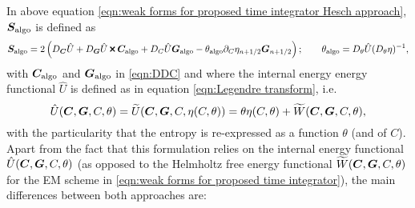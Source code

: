 In above equation \eqref{eqn:weak forms for proposed time integrator Hesch approach}, $\boldsymbol{S}_{\text{algo}}$ is defined as
%
\begin{equation}\label{eqn:approximated expression for DWdeltavarphi Betsch}
\begin{aligned}
\vect{S}_{\text{algo}} = 2\left(D_{\vect{C}}\hat{U} + D_{\vect{G}}\hat{U}\Cross\vect{C}_{\text{algo}} + D_{C}\hat{U}\vect{G}_{\text{algo}} - \theta_{\text{algo}}\partial_C\eta_{n+1/2}\vect{G}_{n+1/2}\right);\qquad
%
\theta_{\text{algo}}=D_{\theta}\hat{U}(D_{\theta}\eta)^{-1},
%
\end{aligned}
\end{equation}
%
with $\boldsymbol{C}_{\text{algo}}$ and $\boldsymbol{G}_{\text{algo}}$ in \eqref{eqn:DDC} and where the internal energy energy functional $\hat{U}$ is defined as in equation \eqref{eqn:Legendre transform}, i.e.
%
\begin{equation}\label{eqn:pseudo-internal energy}
\hat{U}(\boldsymbol{C},\boldsymbol{G},C,\theta)= \widetilde{U}(\boldsymbol{C},\boldsymbol{G},C,\eta(C,\theta)) = \theta\eta(C,\theta) + \widetilde{W}(\boldsymbol{C},\boldsymbol{G},C,\theta),
\end{equation}
%
with the particularity that the entropy is re-expressed as a function $\theta$ (and of $C$). Apart from the fact that this formulation relies on the internal energy functional $\hat{U}(\boldsymbol{C},\boldsymbol{G},C,\theta)$ (as opposed to the Helmholtz free energy functional $\widetilde{W}(\boldsymbol{C},\boldsymbol{G},C,\theta)$ for the EM scheme in \eqref{eqn:weak forms for proposed time integrator}), the main differences between both approaches are:
%
